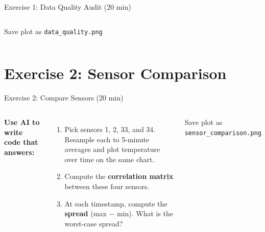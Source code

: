 \documentclass[aspectratio=169,11pt]{beamer}
\begin{document}
\begin{frame}[shrink=5]{Exercise 1: Data Quality Audit (20 min)}
\begin{columns}
        \vspace{0.1cm}
        \begin{alertblock}{\small Save plot as \texttt{data\_quality.png}}
        \end{alertblock}
    \end{columns}
\end{frame}

\section{Exercise 2: Sensor Comparison}

\begin{frame}[shrink=5]{Exercise 2: Compare Sensors (20 min)}
    \begin{columns}
        \textbf{Use AI to write code that answers:}

        \vspace{0.15cm}
        \begin{enumerate}
            \item Pick sensors 1, 2, 33, and 34. Resample each to 5-minute averages and plot temperature over time on the same chart.

            \item Compute the \textbf{correlation matrix} between these four sensors.

            \item At each timestamp, compute the \textbf{spread} (max $-$ min). What is the worst-case spread?
        \end{enumerate}

        \vspace{0.1cm}

        \vspace{0.1cm}
        \begin{alertblock}{\small Save plot as \texttt{sensor\_comparison.png}}
        \end{alertblock}


\end{columns}
\end{frame}
\end{document}
